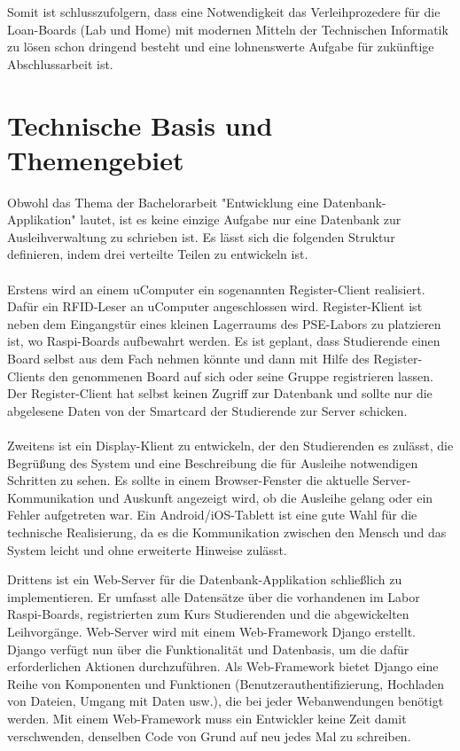 Somit ist schlusszufolgern, dass eine Notwendigkeit das Verleihprozedere für die Loan-Boards (Lab und Home) mit modernen Mitteln der Technischen Informatik zu lösen schon dringend besteht und eine lohnenswerte Aufgabe für zukünftige Abschlussarbeit ist. 

\section{Technische Basis und Themengebiet}
\label{sec:intro:themengebiet}
Obwohl das Thema der Bachelorarbeit "Entwicklung eine Datenbank-Applikation" lautet, ist es keine einzige Aufgabe nur eine Datenbank zur Ausleihverwaltung zu schrieben ist. Es lässt sich die folgenden Struktur definieren, indem drei verteilte Teilen zu entwickeln ist.\\\\
Erstens wird an einem uComputer ein sogenannten Register-Client realisiert. Dafür ein RFID-Leser an uComputer angeschlossen wird. Register-Klient ist neben dem Eingangstür eines kleinen Lagerraums des PSE-Labors zu platzieren ist, wo Raspi-Boards aufbewahrt werden. Es ist geplant, dass Studierende einen Board selbst aus dem Fach nehmen könnte und dann mit Hilfe des Register-Clients den genommenen Board auf sich oder seine Gruppe registrieren lassen. Der Register-Client hat selbst keinen Zugriff zur Datenbank und sollte nur die abgelesene Daten von der Smartcard der Studierende zur Server schicken. \\\\
Zweitens ist ein Display-Klient zu entwickeln, der den Studierenden es zulässt, die Begrüßung des System und eine Beschreibung die für Ausleihe notwendigen Schritten zu sehen. Es sollte in einem Browser-Fenster die aktuelle Server-Kommunikation und Auskunft angezeigt wird, ob die Ausleihe gelang oder ein Fehler aufgetreten war. Ein Android/iOS-Tablett ist eine gute Wahl für die technische Realisierung, da es die Kommunikation zwischen den Mensch und das System leicht und ohne erweiterte Hinweise zulässt. 

Drittens ist ein Web-Server für die Datenbank-Applikation schließlich zu implementieren. Er umfasst alle Datensätze über die vorhandenen im Labor Raspi-Boards, registrierten zum Kurs Studierenden und die abgewickelten Leihvorgänge.  Web-Server wird mit einem Web-Framework Django erstellt.  Django verfügt nun über die Funktionalität und Datenbasis, um die dafür erforderlichen Aktionen durchzuführen. Als Web-Framework bietet Django eine Reihe von Komponenten und Funktionen (Benutzerauthentifizierung, Hochladen von Dateien, Umgang mit Daten usw.), die bei jeder Webanwendungen benötigt werden. Mit einem Web-Framework muss ein Entwickler keine Zeit damit verschwenden, denselben Code von Grund auf neu jedes Mal zu schreiben.

